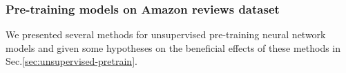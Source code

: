 \subsubsection{Pre-training models on Amazon reviews dataset}
\label{enhan-unsupervised-pretrain}
We presented several methods for unsupervised pre-training neural network models and given some hypotheses on the beneficial effects of these methods in Sec.\ref{sec:unsupervised-pretrain}.
